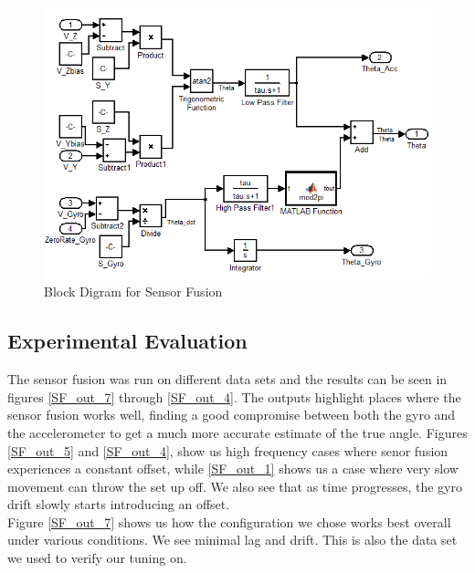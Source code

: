\documentclass{article}
\theoremstyle{plain}
\theoremstyle{definition}
\theoremstyle{remark}
\begin{document}
\begin{figure}[hbt]
\begin{center}
\includegraphics[width = 14cm]{SF_block.png}
\caption{Block Digram for Sensor Fusion}
\label{fusion_Block}
\end{center}
\end{figure}

\subsection{Experimental Evaluation}

The sensor fusion was run on different data sets and the results can be seen in figures \ref{SF_out_7} through \ref{SF_out_4}. The outputs highlight places where the sensor fusion works well, finding a good compromise between both the gyro and the accelerometer to get a much more accurate estimate of the true angle. Figures \ref{SF_out_5} and \ref{SF_out_4}, show us high frequency cases where senor fusion experiences a constant offset, while \ref{SF_out_1} shows us a case where very slow movement can throw the set up off. We also see that as time progresses, the gyro drift slowly starts introducing an offset.\\

Figure \ref{SF_out_7} shows us how the configuration we chose works best overall under various conditions. We see minimal lag and drift. This is also the data set we used to verify our tuning on.
\end{document}
